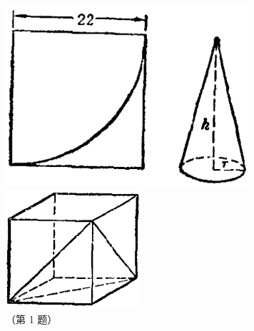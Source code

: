 \begin{enhancedline}
\begin{figure}[htbp]
    \centering
    \begin{minipage}[b]{9cm}
        \centering
        \includegraphics[width=9cm]{../pic/ltjh-ch2-66.png}
        \caption{}\label{fig:ltjh-2-66}
    \end{minipage}
    \qquad \qquad
    \begin{minipage}[b]{5cm}
        \centering
        \includegraphics[width=5cm]{../pic/ltjh-ch2-subsec9-lx-01.png}
        \caption*{（第 1 题）}
    \end{minipage}
\end{figure}


\begin{lianxi}



\end{lianxi}

\end{enhancedline}

